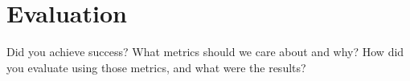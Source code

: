 \section{Evaluation}

Did you achieve success?  What metrics should we care about and why?  How did
you evaluate using those metrics, and what were the results?

